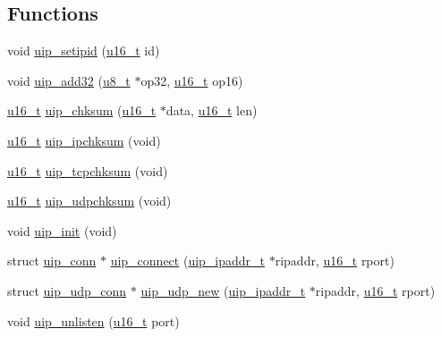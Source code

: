 \subsection*{Functions}
\begin{DoxyCompactItemize}
\item 
void \hyperlink{group__uip_ga22f140b02c354dfebcc7ad481c3bcd68}{uip\_\-setipid} (\hyperlink{group__uipfw_ga77570ac4fcab86864fa1916e55676da2}{u16\_\-t} id)
\item 
void \hyperlink{group__uip_ga6832e4d2d046536b6472f7ac92340f68}{uip\_\-add32} (\hyperlink{group__uipfw_ga4caecabca98b43919dd11be1c0d4cd8e}{u8\_\-t} $\ast$op32, \hyperlink{group__uipfw_ga77570ac4fcab86864fa1916e55676da2}{u16\_\-t} op16)
\item 
\hyperlink{group__uipfw_ga77570ac4fcab86864fa1916e55676da2}{u16\_\-t} \hyperlink{group__uip_ga6affe021225ed773018fb00814bbce06}{uip\_\-chksum} (\hyperlink{group__uipfw_ga77570ac4fcab86864fa1916e55676da2}{u16\_\-t} $\ast$data, \hyperlink{group__uipfw_ga77570ac4fcab86864fa1916e55676da2}{u16\_\-t} len)
\item 
\hyperlink{group__uipfw_ga77570ac4fcab86864fa1916e55676da2}{u16\_\-t} \hyperlink{group__uip_ga2addf34c7d457c1a7899a7e2171ef1e9}{uip\_\-ipchksum} (void)
\item 
\hyperlink{group__uipfw_ga77570ac4fcab86864fa1916e55676da2}{u16\_\-t} \hyperlink{group__uip_ga85b65e38aa74eba18979156f97a94a87}{uip\_\-tcpchksum} (void)
\item 
\hyperlink{group__uipfw_ga77570ac4fcab86864fa1916e55676da2}{u16\_\-t} \hyperlink{group__uip_ga7023a34ba9e9d03b5fbedbcb32924453}{uip\_\-udpchksum} (void)
\item 
void \hyperlink{group__uip_gac48ed5f0d27721ef62a3ed02a5ad8d2e}{uip\_\-init} (void)
\item 
struct \hyperlink{structuip__conn}{uip\_\-conn} $\ast$ \hyperlink{group__uip_ga9c24fba2cd8f7f62accb0a0d5bbe4dad}{uip\_\-connect} (\hyperlink{group__uip_ga1ef35301f43a5bbb9f89f07b5a36b9a0}{uip\_\-ipaddr\_\-t} $\ast$ripaddr, \hyperlink{group__uipfw_ga77570ac4fcab86864fa1916e55676da2}{u16\_\-t} rport)
\item 
struct \hyperlink{structuip__udp__conn}{uip\_\-udp\_\-conn} $\ast$ \hyperlink{group__uip_ga79c4110211247df3fb30b8cf1c4c02af}{uip\_\-udp\_\-new} (\hyperlink{group__uip_ga1ef35301f43a5bbb9f89f07b5a36b9a0}{uip\_\-ipaddr\_\-t} $\ast$ripaddr, \hyperlink{group__uipfw_ga77570ac4fcab86864fa1916e55676da2}{u16\_\-t} rport)
\item 
void \hyperlink{group__uip_gaaa585784b0914cac1d37f07f85457008}{uip\_\-unlisten} (\hyperlink{group__uipfw_ga77570ac4fcab86864fa1916e55676da2}{u16\_\-t} port)

\end{DoxyCompactItemize}
